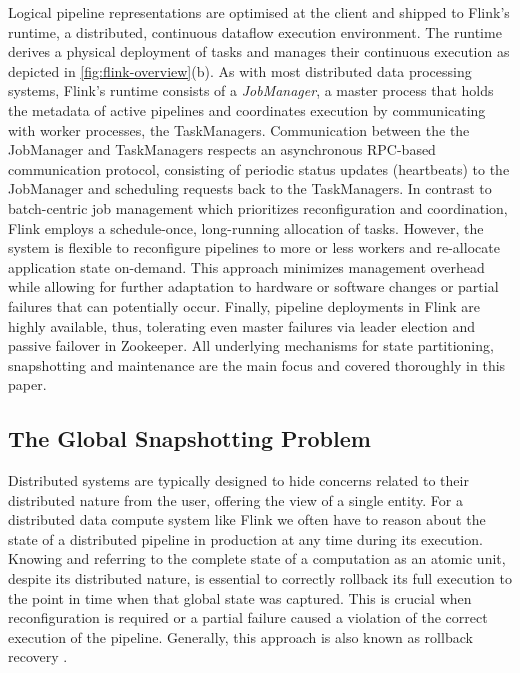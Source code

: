 Logical pipeline representations are optimised at the client and shipped to Flink's runtime, a distributed, continuous dataflow execution environment. The runtime derives a physical deployment of tasks and manages their continuous execution as depicted in \autoref{fig:flink-overview}(b). As with most distributed data processing systems, Flink's runtime consists of a \emph{JobManager}, a master process that holds the metadata of active pipelines and coordinates execution by communicating with worker processes, the TaskManagers. Communication between the the JobManager and TaskManagers respects an asynchronous RPC-based communication protocol, consisting of periodic status updates (heartbeats) to the JobManager and scheduling requests back to the TaskManagers. In contrast to batch-centric job management \cite{zaharia2012discretized} which prioritizes reconfiguration and coordination, Flink employs a schedule-once, long-running allocation of tasks. However, the system is flexible to reconfigure pipelines to more or less workers and re-allocate application state on-demand. This approach minimizes management overhead while allowing for further adaptation to hardware or software changes or partial failures that can potentially occur. Finally, pipeline deployments in Flink are highly available, thus, tolerating even master failures via leader election and passive failover in Zookeeper. All underlying mechanisms for state partitioning, snapshotting and maintenance are the main focus and covered thoroughly in this paper.


\subsection{The Global Snapshotting Problem}

Distributed systems are typically designed to hide concerns related to their distributed nature from the user, offering the view of a single entity. For a distributed data compute system like Flink we often have to reason about the state of a distributed pipeline in production at any time during its execution. Knowing and referring to the complete state of a computation as an atomic unit, despite its distributed nature, is essential to correctly rollback its full execution to the point in time when that global state was captured. This is crucial when reconfiguration is required or a partial failure caused a violation of the correct execution of the pipeline. Generally, this approach is also known as rollback recovery \cite{elnozahy2002survey}. 


